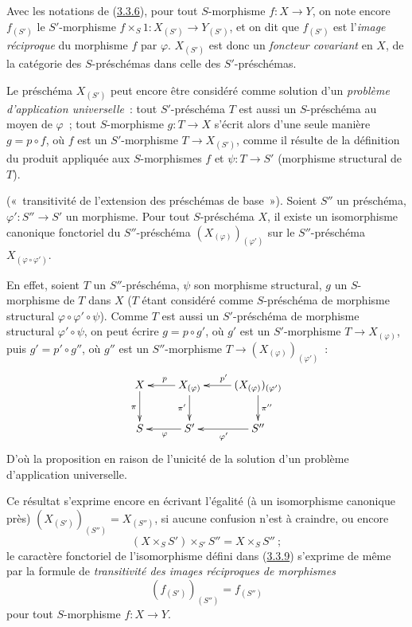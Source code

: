 \begin{env}[3.3.7]
\label{I.3.3.7-fr}
Avec les notations de (\hyperref[I.3.3.6-fr]{3.3.6}), pour tout
$S$-morphisme $f:X\to Y$, on note encore $f_{(S')}$ le $S'$-morphisme
$f\times_S 1:X_{(S')}\to Y_{(S')}$, et on dit que $f_{(S')}$ est
l'\emph{image réciproque} du morphisme $f$ par $\varphi$. $X_{(S')}$ est donc
un \emph{foncteur covariant} en $X$, de la catégorie des $S$-préschémas dans
celle des $S'$-préschémas.
\end{env}

\begin{env}[3.3.8]
\label{I.3.3.8-fr}
Le préschéma $X_{(S')}$ peut encore être considéré comme solution d'un
\emph{problème d'application universelle}~: tout $S'$-préschéma $T$ est aussi
un $S$-préschéma au moyen de $\varphi$~; tout $S$-morphisme $g:T\to X$
s'écrit alors d'une seule manière $g=p\circ f$, où $f$ est un
$S'$-morphisme $T\to X_{(S')}$, comme il résulte de la définition du produit
appliquée aux $S$-morphismes $f$ et $\psi:T\to S'$ (morphisme structural de
$T$).
\end{env}

\begin{proposition}[3.3.9]
\label{I.3.3.9-fr}
\textup{(«~transitivité de l'extension des préschémas de base~»).} Soient
$S''$ un préschéma, $\varphi':S''\to S'$ un morphisme. Pour tout
$S$-préschéma $X$, il existe un isomorphisme canonique fonctoriel du
$S''$-préschéma $(X_{(\varphi)})_{(\varphi')}$ sur le $S''$-préschéma
$X_{(\varphi\circ\varphi')}$.
\end{proposition}

En effet, soient $T$ un $S''$-préschéma, $\psi$ son morphisme structural,
$g$ un $S$-morphisme de $T$ dans $X$ ($T$ étant considéré comme
$S$-préschéma de morphisme structural $\varphi\circ\varphi'\circ\psi$).
Comme $T$ est aussi un $S'$-préschéma de morphisme structural
$\varphi'\circ\psi$, on peut écrire $g=p\circ g'$, où $g'$ est un
$S'$-morphisme $T\to X_{(\varphi)}$, puis $g'=p'\circ g''$, où $g''$ est un
$S''$-morphisme $T\to(X_{(\varphi)})_{(\varphi')}$~:
\label{I.3.3.9.transitivity-diagram-fr}
\[
  \xymatrix{
    X\ar[d]_{\pi} &
    X_{(\varphi)}\ar[l]_{p}\ar[d]_{\pi'} &
    (X_{(\varphi)})_{(\varphi')}\ar[l]_{p'}\ar[d]^{\pi''}\\
    S & S'\ar[l]^{\varphi} & S''\ar[l]^{\varphi'}
  }
\]
D'où la proposition en raison de l'unicité de la solution d'un problème
d'application universelle.

Ce résultat s'exprime encore en écrivant l'égalité (à un isomorphisme
canonique près) $(X_{(S')})_{(S'')}=X_{(S'')}$, si aucune confusion n'est à
craindre, ou encore
\begin{equation}
  (X\times_S S')\times_{S'}S''=X\times_S S''~;
  \tag{3.3.9.1}\label{I.3.3.9.1-fr}
\end{equation}
le caractère fonctoriel de l'isomorphisme défini dans
(\hyperref[I.3.3.9-fr]{3.3.9}) s'exprime de même par la formule de
\emph{transitivité des images réciproques de morphismes}
\begin{equation}
  (f_{(S')})_{(S'')}=f_{(S'')}
  \tag{3.3.9.2}\label{I.3.3.9.2-fr}
\end{equation}
pour tout $S$-morphisme $f:X\to Y$.

